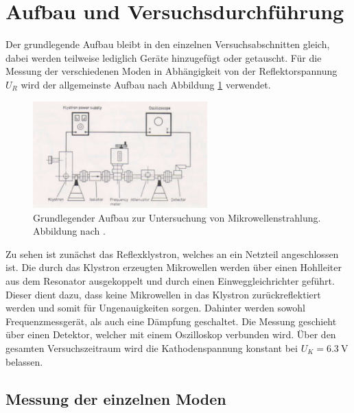 \section{Aufbau und Versuchsdurchführung}

Der grundlegende Aufbau bleibt in den einzelnen Versuchsabschnitten gleich, dabei werden teilweise lediglich Geräte hinzugefügt oder getauscht. 
Für die Messung der verschiedenen Moden in Abhängigkeit von der Reflektorspannung $U_{R}$ wird der allgemeinste Aufbau nach Abbildung \ref{fig:1} verwendet.

\begin{figure}
    \centering
    \includegraphics[width=0.6\textwidth]{bilder/grundaufbau.png}
    \caption{Grundlegender Aufbau zur Untersuchung von Mikrowellenstrahlung. Abbildung nach \cite{skript}.} 
    \label{fig:1}
\end{figure}
Zu sehen ist zunächst das Reflexklystron, welches an ein Netzteil angeschlossen ist. Die durch das Klystron erzeugten Mikrowellen werden über einen Hohlleiter aus dem Resonator ausgekoppelt und durch einen Einweggleichrichter geführt. 
Dieser dient dazu, dass keine Mikrowellen in das Klystron zurückreflektiert werden und somit für Ungenauigkeiten sorgen. 
Dahinter werden sowohl Frequenzmessgerät, als auch eine Dämpfung geschaltet. Die Messung geschieht über einen Detektor, welcher mit einem Oszilloskop verbunden wird. 
Über den gesamten Versuchszeitraum wird die Kathodenspannung konstant bei $U_{K} = \SI{6.3}{\volt}$ belassen.

\subsection{Messung der einzelnen Moden}

